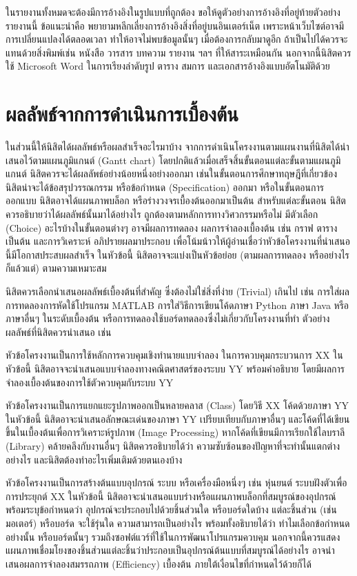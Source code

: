 \documentclass[11pt,a4paper]{article}
\begin{document}
ในรายงานทั้งหมดจะต้องมีการอ้างอิงในรูปแบบที่ถูกต้อง ขอให้ดูตัวอย่างการอ้างอิงที่อยู่ท้ายตัวอย่างรายงานนี้ ข้อแนะนำคือ พยายามหลีกเลี่ยงการอ้างอิงสิ่งที่อยู่บนอินเตอร์เน็ต เพราะหน้าเว็บไซต์อาจมีการเปลี่ยนแปลงได้ตลอดเวลา ทำให้อาจไม่พบข้อมูลนั้นๆ เมื่อต้องการกลับมาดูอีก ถ้าเป็นไปได้ควรจะแทนด้วยสิ่งพิมพ์เช่น หนังสือ วารสาร บทความ รายงาน ฯลฯ ที่ให้สาระเหมือนกัน นอกจากนี้นิสิตควรใช้ Microsoft Word ในการเรียงลำดับรูป ตาราง สมการ และเอกสารอ้างอิงแบบอัตโนมัติด้วย

\section{ผลลัพธ์จากการดำเนินการเบื้องต้น}
ในส่วนนี้ให้นิสิตได้ผลลัพธ์หรือผลสำเร็จอะไรมาบ้าง จากการดำเนินโครงงานตามแผนงานที่นิสิตได้นำเสนอไว้ตามแผนภูมิแกนต์ (Gantt chart) โดยปกติแล้วเมื่อเสร็จสิ้นขั้นตอนแต่ละขั้นตามแผนภูมิแกนต์ นิสิตควรจะได้ผลลัพธ์อย่างน้อยหนึ่งอย่างออกมา เช่นในขั้นตอนการศึกษาทฤษฎีที่เกี่ยวข้อง นิสิตน่าจะได้ข้อสรุปวรรณกรรม หรือข้อกำหนด (Specification) ออกมา หรือในขั้นตอนการออกแบบ นิสิตอาจได้แผนภาพบล็อก หรือร่างวงจรเบื้องต้นออกมาเป็นต้น สำหรับแต่ละขั้นตอน นิสิตควรอธิบายว่าได้ผลลัพธ์นั้นมาได้อย่างไร ถูกต้องตามหลักการทางวิศวกรรมหรือไม่ มีตัวเลือก (Choice) อะไรบ้างในขั้นตอนต่างๆ อาจมีผลการทดลอง ผลการจำลองเบื้องต้น เช่น กราฟ ตาราง เป็นต้น และการวิเคราะห์ อภิปรายผลมาประกอบ เพื่อโน้มน้าวให้ผู้อ่านเชื่อว่าหัวข้อโครงงานที่นำเสนอนี้มีโอกาสประสบผลสำเร็จ ในหัวข้อนี้ นิสิตอาจจะแบ่งเป็นหัวข้อย่อย (ตามผลการทดลอง หรืออย่างไรก็แล้วแต่) ตามความเหมาะสม


นิสิตควรเลือกนำเสนอผลลัพธ์เบื้องต้นที่สำคัญ ซึ่งต้องไม่ใช่สิ่งที่ง่าย (Trivial) เกินไป เช่น การใส่ผลการทดลองการหัดใช้โปรแกรม MATLAB การใส่วิธีการเขียนโค้ดภาษา Python ภาษา Java หรือภาษาอื่นๆ ในระดับเบื้องต้น หรือการทดลองใช้บอร์ดทดลองซึ่งไม่เกี่ยวกับโครงงานที่ทำ ตัวอย่างผลลัพธ์ที่นิสิตควรนำเสนอ เช่น


หัวข้อโครงงานเป็นการใช้หลักการควบคุมเชิงทำนายแบบจำลอง ในการควบคุมกระบวนการ XX ในหัวข้อนี้ นิสิตอาจจะนำเสนอแบบจำลองทางคณิตศาสตร์ของระบบ YY พร้อมคำอธิบาย โดยมีผลการจำลองเบื้องต้นของการใช้ตัวควบคุมกับระบบ YY


หัวข้อโครงงานเป็นการแยกแยะรูปภาพออกเป็นหลายคลาส (Class) โดยวิธี XX โค้ดด้วยภาษา YY ในหัวข้อนี้ นิสิตอาจะนำเสนอลักษณะเด่นของภาษา YY เปรียบเทียบกับภาษาอื่นๆ และโค้ดที่ได้เขียนขึ้นในเบื้องต้นเพื่อการวิเคราะห์รูปภาพ (Image Processing) หากโค้ดที่เขียนมีการเรียกใช้ไลบราลี (Library) คล้ายคลึงกับงานอื่นๆ นิสิตควรอธิบายได้ว่า ความซับซ้อนของปัญหาที่จะทำนั้นแตกต่างอย่างไร และนิสิตต้องทำอะไรเพิ่มเติมด้วยตนเองบ้าง


หัวข้อโครงงานเป็นการสร้างต้นแบบอุปกรณ์ ระบบ หรือเครื่องมือหนึ่งๆ เช่น หุ่นยนต์ ระบบฝังตัวเพื่อการประยุกต์ XX ในหัวข้อนี้ นิสิตอาจะนำเสนอแบบร่างหรือแผนภาพบล็อกที่สมบูรณ์ของอุปกรณ์พร้อมระบุข้อกำหนดว่า อุปกรณ์จะประกอบไปด้วยชิ้นส่วนใด หรือบอร์ดใดบ้าง แต่ละชิ้นส่วน (เช่น มอเตอร์) หรือบอร์ด จะใช้รุ่นใด ความสามารถเป็นอย่างไร พร้อมทั้งอธิบายได้ว่า ทำไมเลือกข้อกำหนดอย่างนั้น หรือบอร์ดนั้นๆ รวมถึงซอฟต์แวร์ที่ใช้ในการพัฒนาโปรแกรมควบคุม นอกจากนี้ควรแสดงแผนภาพเชื่อมโยงของชิ้นส่วนแต่ละชิ้นว่าประกอบเป็นอุปกรณ์ต้นแบบที่สมบูรณ์ได้อย่างไร อาจนำเสนอผลการจำลองสมรรถภาพ (Efficiency) เบื้องต้น ภายใต้เงื่อนไขที่กำหนดไว้ด้วยก็ได้
\end{document}
